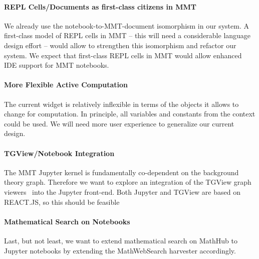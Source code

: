 \paragraph{REPL Cells/Documents as first-class citizens in MMT}
We already use the notebook-to-MMT-document isomorphism in our system. A first-class model of REPL cells in MMT -- this will need a considerable language design effort -- would allow to strengthen this isomorphism and refactor our system.
We expect that first-class REPL cells in MMT would allow enhanced IDE support for MMT notebooks.  

\paragraph{More Flexible Active Computation} The current widget is relatively inflexible in terms of the objects it allows to change for computation.
In principle, all variables and constants from the context could be used.
We will need more user experience to generalize our current design.

\paragraph{TGView/Notebook Integration} The MMT Jupyter kernel is fundamentally co-dependent on the background theory graph. Therefore we want to explore an integration of the TGView graph viewers~\cite{MarKohRab:tsddvtg19} into the Jupyter front-end.
Both Jupyter and TGView are based on REACT.JS, so this should be feasible

\paragraph{Mathematical Search on Notebooks} Last, but not least, we want to extend mathematical search on MathHub to Jupyter notebooks by extending the MathWebSearch harvester accordingly.



